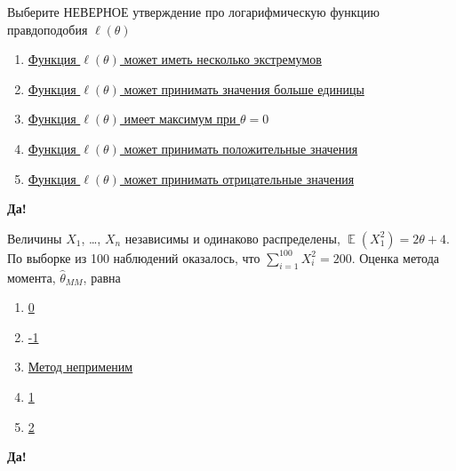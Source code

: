 \documentclass[t]{beamer}
\DeclareMathOperator{\E}{\mathbb{E}}
\begin{document}
 \begin{frame} \label{35-Yes} 
\begin{block}{35} 

 Выберите НЕВЕРНОЕ утверждение про логарифмическую функцию правдоподобия $\ell(\theta)$


 \end{block} 
\begin{enumerate} 
\item[] \hyperlink{35-No}{\beamergotobutton{} Функция $\ell(\theta)$ может иметь несколько экстремумов}
\item[] \hyperlink{35-No}{\beamergotobutton{} Функция $\ell(\theta)$ может принимать значения больше единицы}
\item[] \hyperlink{35-Yes}{\beamergotobutton{} Функция $\ell(\theta)$ имеет максимум при $\theta=0$}
\item[] \hyperlink{35-No}{\beamergotobutton{} Функция $\ell(\theta)$ может принимать положительные значения}
\item[] \hyperlink{35-No}{\beamergotobutton{} Функция $\ell(\theta)$ может принимать отрицательные значения}
\end{enumerate} 

 \textbf{Да!} 
 \hyperlink{36}{}\end{frame} 


 \begin{frame} \label{36-Yes} 
\begin{block}{36} 

Величины $X_1$, \ldots, $X_n$ независимы и одинаково распределены, $\E(X_1^2)=2\theta + 4$. По выборке из 100 наблюдений оказалось, что $\sum_{i=1}^{100} X_i^2 = 200$. Оценка метода момента, $\hat\theta_{MM}$, равна


 \end{block} 
\begin{enumerate} 
\item[] \hyperlink{36-No}{\beamergotobutton{} 0}
\item[] \hyperlink{36-Yes}{\beamergotobutton{} -1}
\item[] \hyperlink{36-No}{\beamergotobutton{} Метод неприменим}
\item[] \hyperlink{36-No}{\beamergotobutton{} 1}
\item[] \hyperlink{36-No}{\beamergotobutton{} 2}
\end{enumerate} 

 \textbf{Да!} 
 \hyperlink{37}{}\end{frame} 
\end{document}

